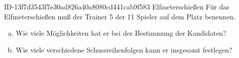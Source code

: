 \begin{exercise}
      {ID-13f7d3543f7e30ad826a40a8080cd441cab9f583}
      {Elfmeterschießen}
  \ifproblem\problem
    Für das Elfmeterschießen muß der Trainer 5 der 11 Spieler auf dem Platz
    benennen.
    \begin{enumerate}[a)]
      \item Wie viele Möglichkeiten hat er bei der Bestimmung der Kandidaten?
      \item Wie viele verschiedene Schussreihenfolgen kann er insgesamt festlegen?
    \end{enumerate}
  \fi
\end{exercise}
